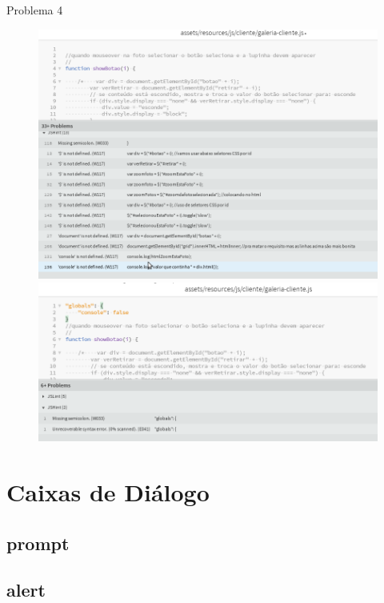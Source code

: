 Problema 4
\begin{figure}[!htb]
\setcounter{figure}{0}
\centering
\begin{minipage}{.5\textwidth}
  \centering
  \includegraphics[width=.9\linewidth]{./img/hint4.png}
\end{minipage}%
\begin{minipage}{.5\textwidth}
  \centering
  \includegraphics[width=.7\linewidth]{./img/hint4-arrumado.png}
\end{minipage}
\end{figure}	

\section{Caixas de Diálogo}

\subsection{prompt}

\subsection{alert}

